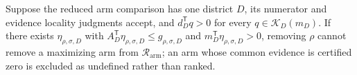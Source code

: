 Suppose the reduced arm comparison has one district \(D\), its numerator and evidence locality judgments accept, and \(d_D^{\mathsf T}q>0\) for every \(q\in\mathcal K_D(m_D)\). If there exists \(\eta_{\rho,\sigma,D}\) with \(A_D^{\mathsf T}\eta_{\rho,\sigma,D}\le g_{\rho,\sigma,D}\) and \(m_D^{\mathsf T}\eta_{\rho,\sigma,D}>0\), removing \(\rho\) cannot remove a maximizing arm from \(\mathcal R_{\mathrm{arm}}\); an arm whose common evidence is certified zero is excluded as undefined rather than ranked.
